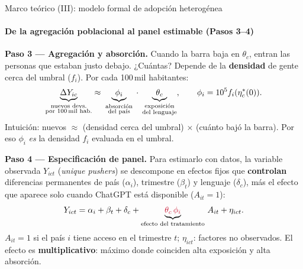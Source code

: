 \documentclass[10pt,aspectratio=169]{beamer}
\begin{document}
\begin{frame}{Marco teórico (III): modelo formal de adopción heterogénea}
\framesubtitle{De la agregación poblacional al panel estimable (Pasos 3--4)}
\small
\textbf{Paso 3 --- Agregación y absorción.} Cuando la barra baja en $\theta_c$, entran las personas que estaban justo debajo. ¿Cuántas? Depende de la \textbf{densidad} de gente cerca del umbral ($f_i$). Por cada 100\,mil habitantes:
\[
\underbrace{\Delta Y_{ic}}_{\substack{\text{nuevos devs.}\\\text{por 100\,mil hab.}}}\approx\; \underbrace{\phi_i}_{\substack{\text{absorción}\\\text{del país}}}\;\cdot\;\underbrace{\theta_c}_{\substack{\text{exposición}\\\text{del lenguaje}}},\qquad \phi_i=10^5 f_i(\eta^*_c(0)).
\]
{\footnotesize Intuición: nuevos $\approx$ (densidad cerca del umbral) $\times$ (cuánto bajó la barra). Por eso $\phi_i$ \emph{es} la densidad $f_i$ evaluada en el umbral.}

\medskip
\textbf{Paso 4 --- Especificación de panel.} Para estimarlo con datos, la variable observada $Y_{ict}$ (\textit{unique pushers}) se descompone en efectos fijos que \textbf{controlan} diferencias permanentes de país ($\alpha_i$), trimestre ($\beta_t$) y lenguaje ($\delta_c$), más el efecto que aparece solo cuando ChatGPT está disponible ($A_{it}=1$):
\[
Y_{ict}=\alpha_i+\beta_t+\delta_c+\underbrace{\textcolor{pucpaccent}{\theta_c\,\phi_i}}_{\text{efecto del tratamiento}}\,A_{it}+\eta_{ict}.
\]
{\footnotesize $A_{it}=1$ si el país $i$ tiene acceso en el trimestre $t$; $\eta_{ict}$: factores no observados. El efecto es \textbf{multiplicativo}: máximo donde coinciden alta exposición y alta absorción.}
\end{frame}
\end{document}
